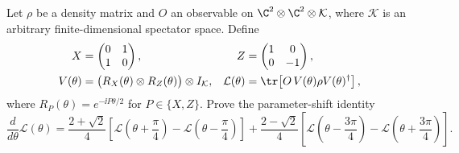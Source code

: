 Let $\rho$ be a density matrix and $O$ an observable on $\C^2\otimes\C^2\otimes\mathcal K$, where $\mathcal K$ is an arbitrary finite-dimensional spectator space.  Define
$$
    \begin{aligned}
    X&=\begin{pmatrix}0&1\\1&0\end{pmatrix},
    &
    Z&=\begin{pmatrix}1&0\\0&-1\end{pmatrix},\\
    V(\theta)&=\bigl(R_X(\theta)\otimes R_Z(\theta)\bigr)\otimes I_{\mathcal K},
    &
    \mathcal L(\theta)&=\tr\!\left[O\,V(\theta)\rho V(\theta)^\dagger\right],
    \end{aligned}
$$
where $R_P(\theta)=e^{-\ii P\theta/2}$ for $P\in\{X,Z\}$.  Prove the parameter-shift identity
$$
    \frac{d}{d\theta}\mathcal L(\theta)
    =
    \frac{2+\sqrt2}{4}
    \left[
        \mathcal L\!\left(\theta+\frac\pi4\right)
        -
        \mathcal L\!\left(\theta-\frac\pi4\right)
    \right]
    +
    \frac{2-\sqrt2}{4}
    \left[
        \mathcal L\!\left(\theta-\frac{3\pi}{4}\right)
        -
        \mathcal L\!\left(\theta+\frac{3\pi}{4}\right)
    \right].
$$
